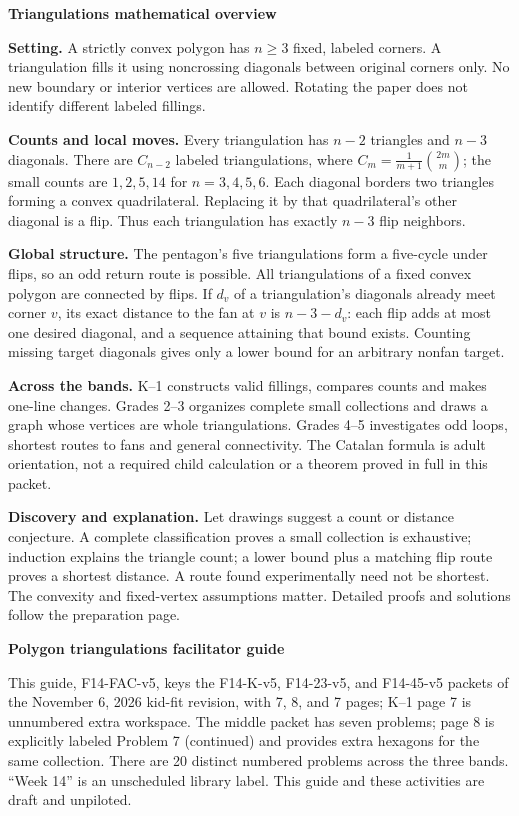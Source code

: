 \documentclass[11pt,letterpaper]{article}
\newcommand{\pagehead}[1]{{\Large\bfseries #1}\par\vspace{3pt}}
\begin{document}
\pagehead{Triangulations mathematical overview}
\textbf{Setting.} A strictly convex polygon has $n\geq3$ fixed, labeled corners. A triangulation fills it using noncrossing diagonals between original corners only. No new boundary or interior vertices are allowed. Rotating the paper does not identify different labeled fillings.

\textbf{Counts and local moves.} Every triangulation has $n-2$ triangles and $n-3$ diagonals. There are $C_{n-2}$ labeled triangulations, where $C_m=\frac{1}{m+1}\binom{2m}{m}$; the small counts are $1,2,5,14$ for $n=3,4,5,6$. Each diagonal borders two triangles forming a convex quadrilateral. Replacing it by that quadrilateral's other diagonal is a flip. Thus each triangulation has exactly $n-3$ flip neighbors.

\textbf{Global structure.} The pentagon's five triangulations form a five-cycle under flips, so an odd return route is possible. All triangulations of a fixed convex polygon are connected by flips. If $d_v$ of a triangulation's diagonals already meet corner $v$, its exact distance to the fan at $v$ is $n-3-d_v$: each flip adds at most one desired diagonal, and a sequence attaining that bound exists. Counting missing target diagonals gives only a lower bound for an arbitrary nonfan target.

\textbf{Across the bands.} K--1 constructs valid fillings, compares counts and makes one-line changes. Grades 2--3 organizes complete small collections and draws a graph whose vertices are whole triangulations. Grades 4--5 investigates odd loops, shortest routes to fans and general connectivity. The Catalan formula is adult orientation, not a required child calculation or a theorem proved in full in this packet.

\textbf{Discovery and explanation.} Let drawings suggest a count or distance conjecture. A complete classification proves a small collection is exhaustive; induction explains the triangle count; a lower bound plus a matching flip route proves a shortest distance. A route found experimentally need not be shortest. The convexity and fixed-vertex assumptions matter. Detailed proofs and solutions follow the preparation page.

\newpage
\pagehead{Polygon triangulations facilitator guide}
This guide, F14-FAC-v5, keys the F14-K-v5, F14-23-v5, and F14-45-v5 packets of the November 6, 2026 kid-fit revision, with 7, 8, and 7 pages; K--1 page 7 is unnumbered extra workspace. The middle packet has seven problems; page 8 is explicitly labeled Problem 7 (continued) and provides extra hexagons for the same collection. There are 20 distinct numbered problems across the three bands. ``Week 14'' is an unscheduled library label. This guide and these activities are draft and unpiloted.
\end{document}

